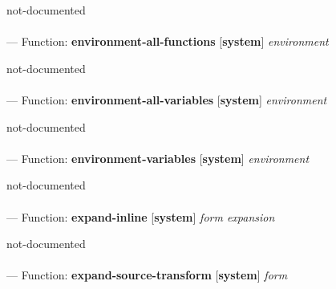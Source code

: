 \begin{adjustwidth}{5em}{5em}
not-documented
\end{adjustwidth}

\paragraph{}
\label{SYSTEM:ENVIRONMENT-ALL-FUNCTIONS}
--- Function: \textbf{environment-all-functions} [\textbf{system}] \textit{environment}

\begin{adjustwidth}{5em}{5em}
not-documented
\end{adjustwidth}

\paragraph{}
\label{SYSTEM:ENVIRONMENT-ALL-VARIABLES}
--- Function: \textbf{environment-all-variables} [\textbf{system}] \textit{environment}

\begin{adjustwidth}{5em}{5em}
not-documented
\end{adjustwidth}

\paragraph{}
\label{SYSTEM:ENVIRONMENT-VARIABLES}
--- Function: \textbf{environment-variables} [\textbf{system}] \textit{environment}

\begin{adjustwidth}{5em}{5em}
not-documented
\end{adjustwidth}

\paragraph{}
\label{SYSTEM:EXPAND-INLINE}
--- Function: \textbf{expand-inline} [\textbf{system}] \textit{form expansion}

\begin{adjustwidth}{5em}{5em}
not-documented
\end{adjustwidth}

\paragraph{}
\label{SYSTEM:EXPAND-SOURCE-TRANSFORM}
--- Function: \textbf{expand-source-transform} [\textbf{system}] \textit{form}

